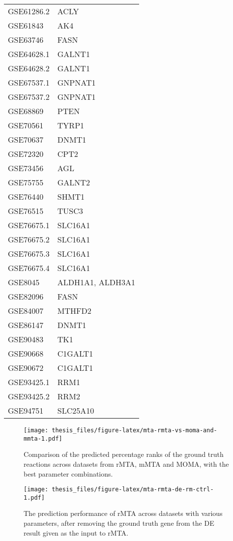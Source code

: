 \documentclass[12pt,twoside,openany,\mydriver]{thesis}  %
\begin{document}
\begin{longtable}[t]{ll}
GSE61286.2 & ACLY\\
\addlinespace
GSE61843 & AK4\\
GSE63746 & FASN\\
GSE64628.1 & GALNT1\\
GSE64628.2 & GALNT1\\
GSE67537.1 & GNPNAT1\\
\addlinespace
GSE67537.2 & GNPNAT1\\
GSE68869 & PTEN\\
GSE70561 & TYRP1\\
GSE70637 & DNMT1\\
GSE72320 & CPT2\\
\addlinespace
GSE73456 & AGL\\
GSE75755 & GALNT2\\
GSE76440 & SHMT1\\
GSE76515 & TUSC3\\
GSE76675.1 & SLC16A1\\
\addlinespace
GSE76675.2 & SLC16A1\\
GSE76675.3 & SLC16A1\\
GSE76675.4 & SLC16A1\\
GSE8045 & ALDH1A1, ALDH3A1\\
GSE82096 & FASN\\
\addlinespace
GSE84007 & MTHFD2\\
GSE86147 & DNMT1\\
GSE90483 & TK1\\
GSE90668 & C1GALT1\\
GSE90672 & C1GALT1\\
\addlinespace
GSE93425.1 & RRM1\\
GSE93425.2 & RRM2\\
GSE94751 & SLC25A10\\
\bottomrule
\end{longtable}
\begin{figure}
\centering
\texttt{[image: thesis\_files/figure-latex/mta-rmta-vs-moma-and-mmta-1.pdf]}
\caption{\label{fig:mta-rmta-vs-moma-and-mmta}Comparison of the predicted percentage ranks of the ground truth reactions across datasets from rMTA, mMTA and MOMA, with the best parameter combinations.}
\end{figure}
\begin{figure}
\centering
\texttt{[image: thesis\_files/figure-latex/mta-rmta-de-rm-ctrl-1.pdf]}
\caption{\label{fig:mta-rmta-de-rm-ctrl}The prediction performance of rMTA across datasets with various parameters, after removing the ground truth gene from the DE result given as the input to rMTA.}
\end{figure}
\end{document}

